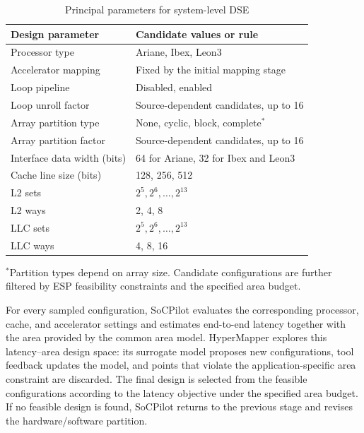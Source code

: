  \begin{table}[t]
      \centering
      \caption{Principal parameters for system-level DSE}
      \label{table:node parameter-all}
      \footnotesize
      \renewcommand\arraystretch{1.12}
      \setlength{\tabcolsep}{3pt}
      \begin{tabularx}{\columnwidth}{@{}p{}X@{}}
          \hline
          \textbf{Design parameter} &
          \textbf{Candidate values or rule} \\ \hline
          Processor type & Ariane, Ibex, Leon3 \\
          Accelerator mapping & Fixed by the initial mapping stage \\
          Loop pipeline & Disabled, enabled \\
          Loop unroll factor & Source-dependent candidates, up to 16 \\
          Array partition type & None, cyclic, block, complete$^{*}$ \\
          Array partition factor & Source-dependent candidates, up to 16 \\
          Interface data width (bits) &
          64 for Ariane, 32 for Ibex and Leon3 \\
          Cache line size (bits) & 128, 256, 512 \\
          L2 sets & $2^{5}, 2^{6}, \ldots, 2^{13}$ \\
          L2 ways & 2, 4, 8 \\
          LLC sets & $2^{5}, 2^{6}, \ldots, 2^{13}$ \\
          LLC ways & 4, 8, 16 \\ \hline
      \end{tabularx}

      \vspace{0.3em}
      \parbox{\columnwidth}{\footnotesize
      $^{*}$Partition types depend on array size.
      Candidate configurations are further filtered by ESP
      feasibility constraints and the specified area budget.}
  \end{table}

For every sampled configuration, SoCPilot evaluates the corresponding processor, cache, and accelerator settings and estimates end-to-end latency together with the area provided by the common area model. HyperMapper \cite{nardi2019hypermapper} explores this latency--area design space: its surrogate model proposes new configurations, tool feedback updates the model, and points that violate the application-specific area constraint are discarded. The final design is selected from the feasible configurations according to the latency objective under the specified area budget. If no feasible design is found, SoCPilot returns to the previous stage and revises the hardware/software partition.

